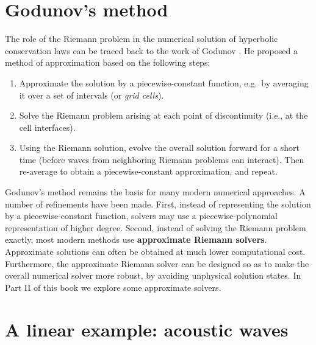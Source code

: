 \documentclass{SIAMbook2016}
\providecommand{\tightlist}{%
      \setlength{\itemsep}{0pt}\setlength{\parskip}{0pt}}
\begin{document}
\hypertarget{godunovs-method}{%
\section{Godunov's method}\label{godunovs-method}}

The role of the Riemann problem in the numerical solution of hyperbolic
conservation laws can be traced back to the work of Godunov
\cite{godunov1959difference}. He proposed a method of approximation
based on the following steps:

\begin{enumerate}
\def\labelenumi{\arabic{enumi}.}
\tightlist
\item
  Approximate the solution by a piecewise-constant function, e.g.~by
  averaging it over a set of intervals (or \emph{grid cells}).
\item
  Solve the Riemann problem arising at each point of discontinuity
  (i.e., at the cell interfaces).
\item
  Using the Riemann solution, evolve the overall solution forward for a
  short time (before waves from neighboring Riemann problems can
  interact). Then re-average to obtain a piecewise-constant
  approximation, and repeat.
\end{enumerate}

Godunov's method remains the basis for many modern numerical approaches.
A number of refinements have been made. First, instead of representing
the solution by a piecewise-constant function, solvers may use a
piecewise-polynomial representation of higher degree. Second, instead of
solving the Riemann problem exactly, most modern methods use
\textbf{approximate Riemann solvers}. Approximate solutions can often be
obtained at much lower computational cost. Furthermore, the approximate
Riemann solver can be designed so as to make the overall numerical
solver more robust, by avoiding unphysical solution states. In Part II
of this book we explore some approximate solvers.

\hypertarget{a-linear-example-acoustic-waves}{%
\section{A linear example: acoustic
waves}\label{a-linear-example-acoustic-waves}}
\end{document}
